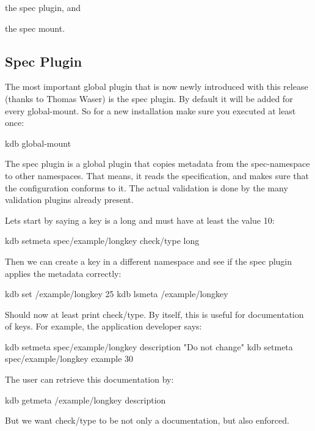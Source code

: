 \begin{DoxyEnumerate}
\item the spec plugin, and
\item the spec mount.
\end{DoxyEnumerate}

\subsection*{Spec Plugin}

The most important global plugin that is now newly introduced with this release (thanks to Thomas Waser) is the {\ttfamily spec} plugin. By default it will be added for every global-\/mount. So for a new installation make sure you executed at least once\+: \begin{DoxyVerb}kdb global-mount
\end{DoxyVerb}


The spec plugin is a global plugin that copies metadata from the {\ttfamily spec}-\/namespace to other namespaces. That means, it reads the specification, and makes sure that the configuration conforms to it. The actual validation is done by the many validation plugins already present.

Lets start by saying a key is a long and must have at least the value 10\+: \begin{DoxyVerb}kdb setmeta spec/example/longkey check/type long
\end{DoxyVerb}


Then we can create a key in a different namespace and see if the {\ttfamily spec} plugin applies the metadata correctly\+: \begin{DoxyVerb}kdb set /example/longkey 25
kdb lsmeta /example/longkey
\end{DoxyVerb}


Should now at least print {\ttfamily check/type}. By itself, this is useful for documentation of keys. For example, the application developer says\+: \begin{DoxyVerb}kdb setmeta spec/example/longkey description "Do not change"
kdb setmeta spec/example/longkey example 30
\end{DoxyVerb}


The user can retrieve this documentation by\+: \begin{DoxyVerb}kdb getmeta /example/longkey description
\end{DoxyVerb}


But we want {\ttfamily check/type} to be not only a documentation, but also enforced.

